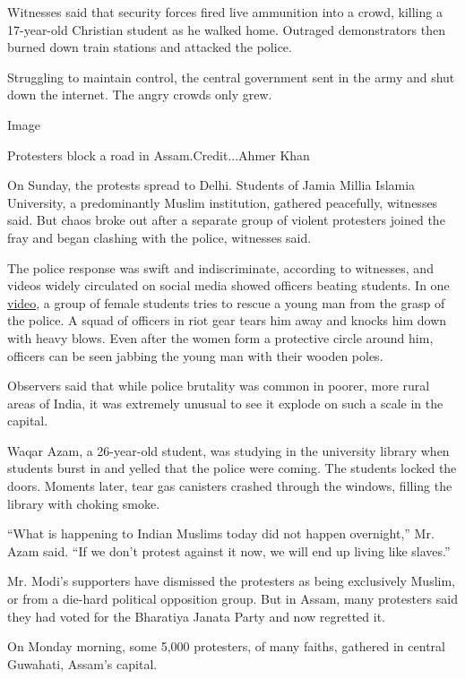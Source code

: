 Witnesses said that security forces fired live ammunition into a crowd,
killing a 17-year-old Christian student as he walked home. Outraged
demonstrators then burned down train stations and attacked the police.

Struggling to maintain control, the central government sent in the army
and shut down the internet. The angry crowds only grew.

Image

Protesters block a road in Assam.Credit...Ahmer Khan

On Sunday, the protests spread to Delhi. Students of Jamia Millia
Islamia University, a predominantly Muslim institution, gathered
peacefully, witnesses said. But chaos broke out after a separate group
of violent protesters joined the fray and began clashing with the
police, witnesses said.

The police response was swift and indiscriminate, according to
witnesses, and videos widely circulated on social media showed officers
beating students. In one
\href{https://twitter.com/Free_soul_ali/status/1206281963725885440}{video},
a group of female students tries to rescue a young man from the grasp of
the police. A squad of officers in riot gear tears him away and knocks
him down with heavy blows. Even after the women form a protective circle
around him, officers can be seen jabbing the young man with their wooden
poles.

Observers said that while police brutality was common in poorer, more
rural areas of India, it was extremely unusual to see it explode on such
a scale in the capital.

Waqar Azam, a 26-year-old student, was studying in the university
library when students burst in and yelled that the police were coming.
The students locked the doors. Moments later, tear gas canisters crashed
through the windows, filling the library with choking smoke.

``What is happening to Indian Muslims today did not happen overnight,''
Mr. Azam said. ``If we don't protest against it now, we will end up
living like slaves.''

Mr. Modi's supporters have dismissed the protesters as being exclusively
Muslim, or from a die-hard political opposition group. But in Assam,
many protesters said they had voted for the Bharatiya Janata Party and
now regretted it.

On Monday morning, some 5,000 protesters, of many faiths, gathered in
central Guwahati, Assam's capital.

